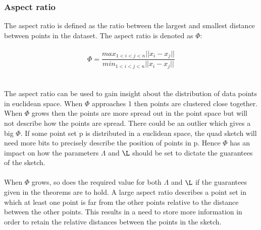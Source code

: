 \subsubsection{Aspect ratio}
\label{sec:aspect_ratio}
The aspect ratio is defined as the ratio between the largest and smallest distance between points in the dataset\cite{wagner17}. The aspect ratio is denoted as $\Phi$:
\\
\\
$$ \Phi = \frac{max_{1<i<j<n} || x_i - x_j || }{min_{1<i<j<n} || x_i - x_j || } $$
\\
\\
The aspect ratio can be used to gain insight about the distribution of data points in euclidean space. When $\Phi$ approaches 1 then points are clustered close together. When $\Phi$ grows then the points are more spread out in the point space but will not describe how the points are spread. There could be an outlier which gives a big $\Phi$. If some point set p is distributed in a euclidean space, the quad sketch will need more bits to precisely describe the position of points in p. Hence $\Phi$ has an impact on how the parameters $\Lambda$ and $\L$ should be set to dictate the guarantees of the sketch.
\\
\\
When $\Phi$ grows, so does the required value for both $\Lambda$ and $\L$ if the guarantees given in the theorems are to hold. A large aspect ratio describes a point set in which at least one point is far from the other points relative to the distance between the other points. This results in a need to store more information in order to retain the relative distances between the points in the sketch.

